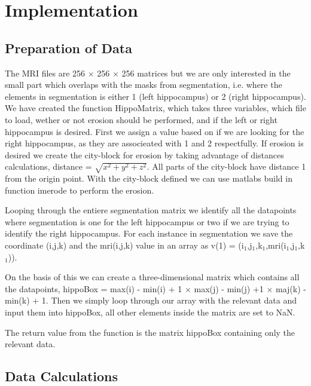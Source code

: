 \chapter{Implementation}

\section{Preparation of Data}
The MRI files are 256 $\times$ 256 $\times$ 256 matrices but we are only interested in the small part which overlaps with the masks from segmentation, i.e. where the elements in segmentation is either 1 (left hippocampus) or 2 (right hippocampus).
We have created the function HippoMatrix, which takes three variables, which file to load, wether or not erosion should be performed, and if the left or right hippocampus is desired.
First we assign a value based on if we are looking for the right hippocampus, as they are associeated with 1 and 2 respectfully.
If erosion is desired we create the city-block for erosion by taking advantage of distances calculations, distance = $\sqrt{x^2+y^2+z^2}$. All parts of the city-block have distance 1 from the origin point. With the city-block defined we can use matlabs build in function imerode to perform the erosion. 

Looping through the entiere segmentation matrix we identify all the datapoints where segmentation is one for the left hippocampus or two if we are trying to identify the right hippocampus. For each instance in segmentation we save the coordinate (i,j,k) and the mri(i,j,k) value in an array as v(1) = (i$_1$,j$_1$,k$_1$,mri(i$_1$,j$_1$,k$_1$)).

On the basis of this we can create a three-dimensional matrix which contains all the datapoints, hippoBox = max(i) - min(i) + 1 $\times$ max(j) - min(j) +1 $\times$ maj(k) - min(k) + 1.
Then we simply loop through our array with the relevant data and input them into hippoBox, all other elements inside the matrix are set to NaN. 

The return value from the function is the matrix hippoBox containing only the relevant data.

\section{Data Calculations}


